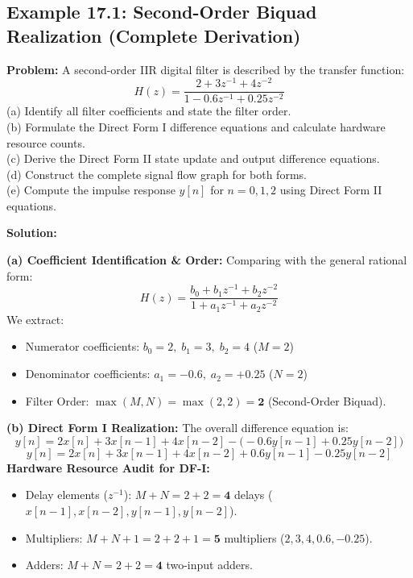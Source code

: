 \documentclass[11pt,a4paper]{article}
\begin{document}
\subsection{Example 17.1: Second-Order Biquad Realization (Complete Derivation)}
\textbf{Problem:} A second-order IIR digital filter is described by the transfer function:
\begin{equation}
H(z) = \frac{2 + 3 z^{-1} + 4 z^{-2}}{1 - 0.6 z^{-1} + 0.25 z^{-2}}
\end{equation}
(a) Identify all filter coefficients and state the filter order. \\
(b) Formulate the Direct Form I difference equations and calculate hardware resource counts. \\
(c) Derive the Direct Form II state update and output difference equations. \\
(d) Construct the complete signal flow graph for both forms. \\
(e) Compute the impulse response $y[n]$ for $n = 0, 1, 2$ using Direct Form II equations.

\vspace{0.3cm}
\noindent\textbf{Solution:}

\noindent\textbf{(a) Coefficient Identification \& Order:}
Comparing with the general rational form:
\begin{equation}
H(z) = \frac{b_0 + b_1 z^{-1} + b_2 z^{-2}}{1 + a_1 z^{-1} + a_2 z^{-2}}
\end{equation}
We extract:
\begin{itemize}
    \item Numerator coefficients: $b_0 = 2, \; b_1 = 3, \; b_2 = 4$ ($M = 2$)
    \item Denominator coefficients: $a_1 = -0.6, \; a_2 = +0.25$ ($N = 2$)
    \item Filter Order: $\max(M, N) = \max(2, 2) = \mathbf{2}$ (Second-Order Biquad).
\end{itemize}

\vspace{0.2cm}
\noindent\textbf{(b) Direct Form I Realization:}
The overall difference equation is:
\begin{equation}
y[n] = 2 x[n] + 3 x[n-1] + 4 x[n-2] - \Big( -0.6 y[n-1] + 0.25 y[n-2] \Big)
\end{equation}
\begin{equation}
y[n] = 2 x[n] + 3 x[n-1] + 4 x[n-2] + 0.6 y[n-1] - 0.25 y[n-2]
\end{equation}
\textbf{Hardware Resource Audit for DF-I:}
\begin{itemize}
    \item Delay elements ($z^{-1}$): $M + N = 2 + 2 = \mathbf{4}$ delays ($x[n-1], x[n-2], y[n-1], y[n-2]$).
    \item Multipliers: $M + N + 1 = 2 + 2 + 1 = \mathbf{5}$ multipliers ($2, 3, 4, 0.6, -0.25$).
    \item Adders: $M + N = 2 + 2 = \mathbf{4}$ two-input adders.
\end{itemize}
\end{document}
